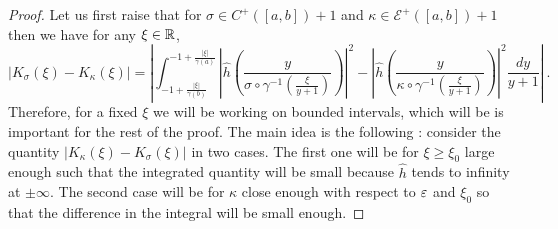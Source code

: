 \begin{proof}
	
	Let us first raise that for $\sigma\in C^+([a,b])+1$ and $\kappa\in\mathcal{E}^+([a,b])+1$ then we have for any $\xi\in\mathbb{R}$,
	\begin{equation*}
		|K_\sigma(\xi)-K_\kappa(\xi)| = \left|\int_{-1+\frac{|\xi|}{\gamma(b)}}^{-1+\frac{|\xi|}{\gamma(a)}} \left|\hat{h}\left(\frac{y}{\sigma\circ\gamma^{-1}(\frac{\xi}{y+1})}\right)\right|^2-\left|\hat{h}\left(\frac{y}{\kappa\circ\gamma^{-1}(\frac{\xi}{y+1})}\right)\right|^2 \frac{dy}{y+1} \right|\ .
	\end{equation*}
	Therefore, for a fixed $\xi$ we will be working on bounded intervals, which will be is important for the rest of the proof. The main idea is the following  : consider the quantity $|K_\kappa(\xi)-K_\sigma(\xi)|$ in two cases. The first one will be for $\xi\geqslant\xi_0$ large enough such that the integrated quantity will be small because $\hat{h}$ tends to infinity at $\pm\infty$. The second case will be for $\kappa$ close enough with respect to $\varepsilon$ and $\xi_0$ so that the difference in the integral will be small enough.
	

\end{proof}
